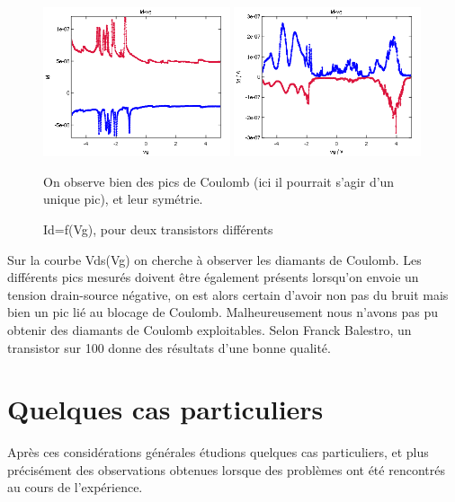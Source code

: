 \begin{figure}[h]
    \begin{center}
        \includegraphics[width=0.49\textwidth]{Images/Image_Blocage_Coulomb_1.png}
        \includegraphics[width=0.49\textwidth]{Images/Image_Blocage_Coulomb_2.png}
        \caption{Id=f(Vg), pour deux transistors différents}
         On observe bien des pics de Coulomb (ici il pourrait s'agir d'un unique pic), et leur symétrie.
        \label{fig:}
    \end{center}
\end{figure}


Sur la courbe Vds(Vg) on cherche à observer les diamants de Coulomb. Les différents pics mesurés doivent être également présents lorsqu'on envoie un tension drain-source négative, on est alors certain d'avoir non pas du bruit mais bien un pic lié au blocage de Coulomb.
Malheureusement nous n'avons pas pu obtenir des diamants de Coulomb exploitables. Selon Franck Balestro, un transistor sur 100 donne des résultats d'une bonne qualité.

\section{Quelques cas particuliers}
Après ces considérations générales étudions quelques cas particuliers, et plus précisément des observations obtenues lorsque des problèmes ont été rencontrés au cours de l'expérience.

